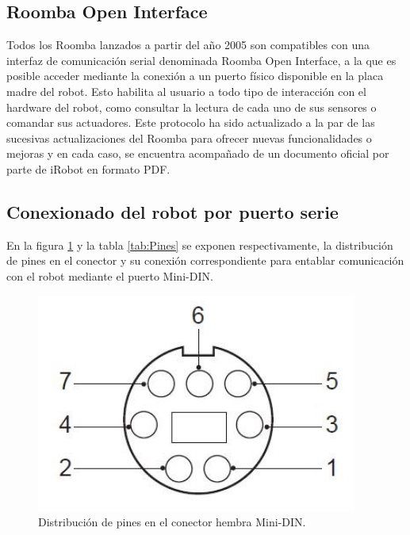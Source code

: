 \subsection{Roomba Open Interface}\label{sec:openInterface}
Todos los Roomba lanzados a partir del año 2005 son compatibles con una interfaz de comunicación serial denominada Roomba Open Interface, a la que es posible acceder mediante la conexión a un puerto físico disponible en la placa madre del robot. Esto habilita al usuario a todo tipo de interacción con el hardware del robot, como consultar la lectura de cada uno de sus sensores o comandar sus actuadores. Este protocolo ha sido actualizado a la par de las sucesivas actualizaciones del Roomba para ofrecer nuevas funcionalidades o mejoras y en cada caso, se encuentra acompañado de un documento oficial por parte de iRobot en formato PDF\protect\footnotemark.



\subsection{Conexionado del robot por puerto serie}

En la figura \ref{fig:roombaPinout} y la tabla \ref{tab:Pines} se exponen respectivamente, la distribución de pines en el conector y su conexión correspondiente para entablar comunicación con el robot mediante el puerto Mini-DIN.

\begin{figure}[ht]
    \centering
    \includegraphics[scale=.4]{./Figures/pinout.png}
    \caption{Distribución de pines en el conector hembra Mini-DIN.}
    \label{fig:roombaPinout}
\end{figure}

